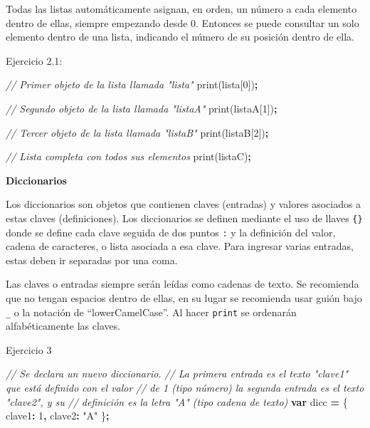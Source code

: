 \documentclass[
  12pt,
  letterpaper,
  twoside]{book}
\newenvironment{Shaded}{\begin{snugshade}}{\end{snugshade}}
\newcommand{\CommentTok}[1]{\textcolor[rgb]{0.56,0.35,0.01}{\textit{#1}}}
\newcommand{\DataTypeTok}[1]{\textcolor[rgb]{0.13,0.29,0.53}{#1}}
\newcommand{\DecValTok}[1]{\textcolor[rgb]{0.00,0.00,0.81}{#1}}
\newcommand{\FunctionTok}[1]{\textcolor[rgb]{0.00,0.00,0.00}{#1}}
\newcommand{\KeywordTok}[1]{\textcolor[rgb]{0.13,0.29,0.53}{\textbf{#1}}}
\newcommand{\NormalTok}[1]{#1}
\newcommand{\OperatorTok}[1]{\textcolor[rgb]{0.81,0.36,0.00}{\textbf{#1}}}
\newcommand{\StringTok}[1]{\textcolor[rgb]{0.31,0.60,0.02}{#1}}
\begin{document}
Todas las listas automáticamente asignan, en orden, un número a cada elemento dentro de ellas, siempre empezando desde 0. Entonces se puede consultar un solo elemento dentro de una lista, indicando el número de su posición dentro de ella.

Ejercicio 2.1:

\begin{Shaded}
\begin{Highlighting}[]
\CommentTok{// Primer objeto de la lista llamada "lista"}
\FunctionTok{print}\NormalTok{(lista[}\DecValTok{0}\NormalTok{])}\OperatorTok{;} 

\CommentTok{// Segundo objeto de la lista llamada "listaA"}
\FunctionTok{print}\NormalTok{(listaA[}\DecValTok{1}\NormalTok{])}\OperatorTok{;}

\CommentTok{// Tercer objeto de la lista llamada "listaB"}
\FunctionTok{print}\NormalTok{(listaB[}\DecValTok{2}\NormalTok{])}\OperatorTok{;}

\CommentTok{// Lista completa con todos sus elementos}
\FunctionTok{print}\NormalTok{(listaC)}\OperatorTok{;}    
\end{Highlighting}
\end{Shaded}

\textbf{Diccionarios}

Los diccionarios son objetos que contienen claves (entradas) y valores asociados a estas claves (definiciones). Los diccionarios se definen mediante el uso de llaves \texttt{\{\}} donde se define cada clave seguida de dos puntos \texttt{:} y la definición del valor, cadena de caracteres, o lista asociada a esa clave. Para ingresar varias entradas, estas deben ir separadas por una coma.

Las claves o entradas siempre serán leídas como cadenas de texto. Se recomienda que no tengan espacios dentro de ellas, en su lugar se recomienda usar guión bajo \texttt{\_} o la notación de ``lowerCamelCase''. Al hacer \texttt{print} se ordenarán alfabéticamente las claves.

Ejercicio 3

\begin{Shaded}
\begin{Highlighting}[]
\CommentTok{// Se declara un nuevo diccionario.}
\CommentTok{// La primera entrada es el texto "clave1" que está definido con el valor}
\CommentTok{// de 1 (tipo número) la segunda entrada es el texto "clave2", y su }
\CommentTok{// definición es la letra "A" (tipo cadena de texto)}
\KeywordTok{var}\NormalTok{ dicc }\OperatorTok{=}\NormalTok{ \{   }
  \DataTypeTok{clave1}\OperatorTok{:} \DecValTok{1}\OperatorTok{,}      
  \DataTypeTok{clave2}\OperatorTok{:} \StringTok{"A"}  
\NormalTok{\}}\OperatorTok{;}            
      
\end{Highlighting}
\end{Shaded}
\end{document}
